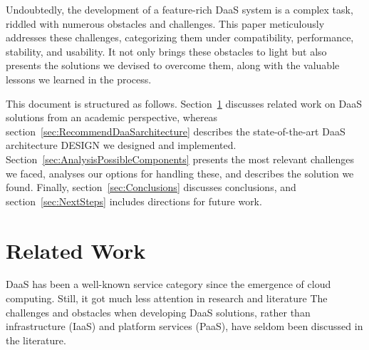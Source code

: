 \documentclass[runningheads]{llncs}
\begin{document}
Undoubtedly, the development of a feature-rich DaaS system is a complex task, riddled with numerous obstacles and challenges. This paper meticulously addresses these challenges, categorizing them under compatibility, performance, stability, and usability. It not only brings these obstacles to light but also presents the solutions we devised to overcome them, along with the valuable lessons we learned in the process.

This document is structured as follows. Section~\ref{sec:relatedworkAbschnitt} discusses related work on DaaS solutions from an academic perspective, whereas section~\ref{sec:RecommendDaaSarchitecture} describes the state-of-the-art DaaS architecture DESIGN we designed and implemented. Section~\ref{sec:AnalysisPossibleComponents} presents the most relevant challenges we faced, analyses our options for handling these, and describes the solution we found. Finally, section~\ref{sec:Conclusions} discusses conclusions, and section~\ref{sec:NextSteps} includes directions for future work.



\section{Related Work}
\label{sec:relatedworkAbschnitt}


DaaS has been a well-known service category since the emergence of cloud computing. Still, it got much less attention in research and literature
The challenges and obstacles when developing DaaS solutions, rather than infrastructure (IaaS) and platform services (PaaS), have seldom been discussed in the literature.
\end{document}
